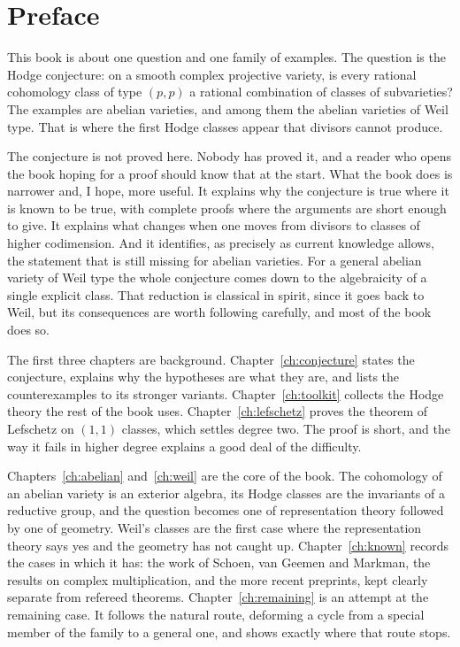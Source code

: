 \chapter*{Preface}

This book is about one question and one family of examples. The question is
the Hodge conjecture: on a smooth complex projective variety, is every
rational cohomology class of type $(p,p)$ a rational combination of classes
of subvarieties? The examples are abelian varieties, and among them the
abelian varieties of Weil type. That is where the first Hodge classes appear
that divisors cannot produce.

The conjecture is not proved here. Nobody has proved it, and a reader who
opens the book hoping for a proof should know that at the start. What the
book does is narrower and, I hope, more useful. It explains why the
conjecture is true where it is known to be true, with complete proofs where
the arguments are short enough to give. It explains what changes when one
moves from divisors to classes of higher codimension. And it identifies, as
precisely as current knowledge allows, the statement that is still missing
for abelian varieties. For a general abelian variety of Weil type the whole
conjecture comes down to the algebraicity of a single explicit class. That
reduction is classical in spirit, since it goes back to Weil, but its
consequences are worth following carefully, and most of the book does so.

The first three chapters are background. Chapter~\ref{ch:conjecture} states
the conjecture, explains why the hypotheses are what they are, and lists the
counterexamples to its stronger variants. Chapter~\ref{ch:toolkit} collects
the Hodge theory the rest of the book uses. Chapter~\ref{ch:lefschetz}
proves the theorem of Lefschetz on $(1,1)$ classes, which settles degree
two. The proof is short, and the way it fails in higher degree explains a
good deal of the difficulty.

Chapters~\ref{ch:abelian} and~\ref{ch:weil} are the core of the book. The
cohomology of an abelian variety is an exterior algebra, its Hodge classes
are the invariants of a reductive group, and the question becomes one of
representation theory followed by one of geometry. Weil's classes are the
first case where the representation theory says yes and the geometry has
not caught up. Chapter~\ref{ch:known} records the cases in which it has:
the work of Schoen, van Geemen and Markman, the results on complex
multiplication, and the more recent preprints, kept clearly separate from
refereed theorems. Chapter~\ref{ch:remaining} is an attempt at the
remaining case. It follows the natural route, deforming a cycle from a
special member of the family to a general one, and shows exactly where that
route stops.

